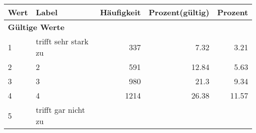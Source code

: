      \begin{longtable}{lXrrr}
     \toprule
     \textbf{Wert} & \textbf{Label} & \textbf{Häufigkeit} & \textbf{Prozent(gültig)} & \textbf{Prozent} \\
     \endhead
     \midrule
     \multicolumn{5}{l}{\textbf{Gültige Werte}}\\

     1 &
     \multicolumn{1}{X}{ trifft sehr stark zu   } &


       \num{337} &
       \num[round-mode=places,round-precision=2]{7.32} &
         \num[round-mode=places,round-precision=2]{3.21} \\

     2 &
     \multicolumn{1}{X}{ 2   } &


       \num{591} &
       \num[round-mode=places,round-precision=2]{12.84} &
         \num[round-mode=places,round-precision=2]{5.63} \\

     3 &
     \multicolumn{1}{X}{ 3   } &


       \num{980} &
       \num[round-mode=places,round-precision=2]{21.3} &
         \num[round-mode=places,round-precision=2]{9.34} \\

     4 &
     \multicolumn{1}{X}{ 4   } &


       \num{1214} &
       \num[round-mode=places,round-precision=2]{26.38} &
         \num[round-mode=places,round-precision=2]{11.57} \\

     5 &
     \multicolumn{1}{X}{ trifft gar nicht zu   } &



\end{longtable}

